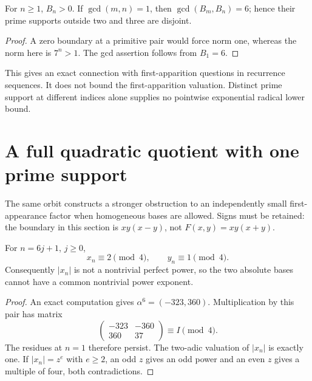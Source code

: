 \begin{corollary}
For $n\ge1$, $B_n>0$. If $\gcd(m,n)=1$, then $\gcd(B_m,B_n)=6$; hence their prime supports outside two and three are disjoint.
\end{corollary}
\begin{proof}
A zero boundary at a primitive pair would force norm one, whereas the norm here is $7^n>1$. The gcd assertion follows from $B_1=6$.
\end{proof}
This gives an exact connection with first-apparition questions in recurrence sequences. It does not bound the first-apparition valuation. Distinct prime support at different indices alone supplies no pointwise exponential radical lower bound.

\section{A full quadratic quotient with one prime support}
The same orbit constructs a stronger obstruction to an independently small first-appearance factor when homogeneous bases are allowed. Signs must be retained: the boundary in this section is $xy(x-y)$, not $F(x,y)=xy(x+y)$.

\begin{lemma}\label{eisenstein:lem:modfour}
For $n=6j+1$, $j\ge0$,
\[
x_n\equiv2\pmod4,\qquad y_n\equiv1\pmod4.
\]
Consequently $|x_n|$ is not a nontrivial perfect power, so the two absolute bases cannot have a common nontrivial power exponent.
\end{lemma}
\begin{proof}
An exact computation gives $\alpha^6=(-323,360)$. Multiplication by this pair has matrix
\[
\begin{pmatrix}-323&-360\\360&37\end{pmatrix}\equiv I\pmod4.
\]
The residues at $n=1$ therefore persist. The two-adic valuation of $|x_n|$ is exactly one. If $|x_n|=z^e$ with $e\ge2$, an odd $z$ gives an odd power and an even $z$ gives a multiple of four, both contradictions.
\end{proof}

